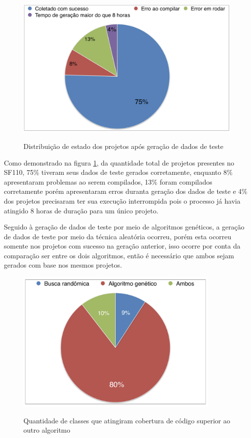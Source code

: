 \documentclass[
	12pt,				%
	oneside,			%
	a4paper,			%
	english,			%
	brazil				%
	]{abntex2ppgsi}
\begin{document}
\begin{figure}[H]%
	\centering
 	  \caption{Distribuição de estado dos projetos após geração de dados de teste}
		\includegraphics[width=\textwidth]{status_projetos.png}
	\label{fig:distribuicao-estados-projetos}
\end{figure}

Como demonstrado na figura \ref{fig:distribuicao-estados-projetos}, da quantidade total de projetos presentes no SF110, 75\% tiveram seus dados de teste gerados corretamente, enquanto 8\% apresentaram problemas ao serem compilados, 13\% foram compilados corretamente porém apresentaram erros duranta geração dos dados de teste e 4\% dos projetos precisaram ter sua execução interrompida pois o processo já havia atingido 8 horas de duração para um único projeto.

Seguido à geração de dados de teste por meio de algoritmos genéticos, a geração de dados de teste por meio da técnica aleatória ocorreu, porém esta ocorreu somente nos projetos com sucesso na geração anterior, isso ocorre por conta da comparação ser entre os dois algoritmos, então é necessário que ambos sejam gerados com base nos mesmos projetos.

\begin{figure}[H]%
	\centering
 	  \caption{Quantidade de classes que atingiram cobertura de código superior ao outro algoritmo}
		\includegraphics[width=10cm]{cobertura_evosuite.png}
	\label{fig:distribuicao-cobertura-evosuite}
\end{figure}
\end{document}
